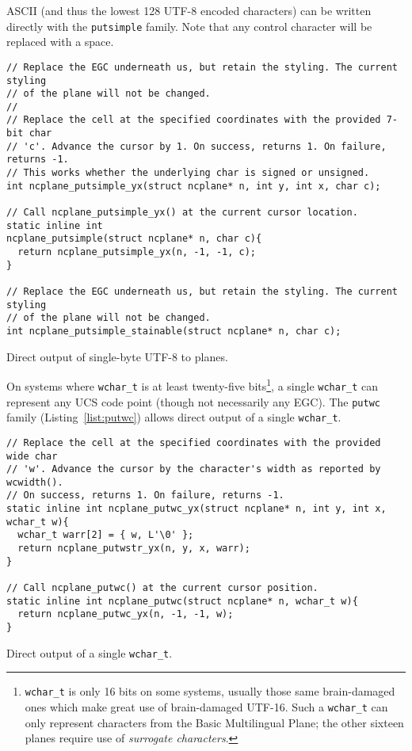 ASCII (and thus the lowest 128 UTF-8 encoded characters) can be written directly
with the \texttt{putsimple} family. Note that any control character will be replaced with
a space.

\begin{listing}[!htbp]
\begin{verbatim}
// Replace the EGC underneath us, but retain the styling. The current styling
// of the plane will not be changed.
//
// Replace the cell at the specified coordinates with the provided 7-bit char
// 'c'. Advance the cursor by 1. On success, returns 1. On failure, returns -1.
// This works whether the underlying char is signed or unsigned.
int ncplane_putsimple_yx(struct ncplane* n, int y, int x, char c);

// Call ncplane_putsimple_yx() at the current cursor location.
static inline int
ncplane_putsimple(struct ncplane* n, char c){
  return ncplane_putsimple_yx(n, -1, -1, c);
}

// Replace the EGC underneath us, but retain the styling. The current styling
// of the plane will not be changed.
int ncplane_putsimple_stainable(struct ncplane* n, char c);
\end{verbatim}
\caption{Direct output of single-byte UTF-8 to planes.}
\label{list:putc}
\end{listing}

On systems where \texttt{wchar\_t} is at least twenty-five bits\footnote{\texttt{wchar\_t}
  is only 16 bits on some systems, usually those same brain-damaged ones which
  make great use of brain-damaged UTF-16. Such a \texttt{wchar\_t} can only
represent characters from the Basic Multilingual Plane; the other sixteen planes
require use of \textit{surrogate characters}.}, a single \texttt{wchar\_t} can
represent any UCS code point (though not necessarily any EGC). The
\texttt{putwc} family (Listing~\ref{list:putwc}) allows direct output of a single \texttt{wchar\_t}.

\begin{listing}[!htbp]
\begin{verbatim}
// Replace the cell at the specified coordinates with the provided wide char
// 'w'. Advance the cursor by the character's width as reported by wcwidth().
// On success, returns 1. On failure, returns -1.
static inline int ncplane_putwc_yx(struct ncplane* n, int y, int x, wchar_t w){
  wchar_t warr[2] = { w, L'\0' };
  return ncplane_putwstr_yx(n, y, x, warr);
}

// Call ncplane_putwc() at the current cursor position.
static inline int ncplane_putwc(struct ncplane* n, wchar_t w){
  return ncplane_putwc_yx(n, -1, -1, w);
}
\end{verbatim}
\caption{Direct output of a single \texttt{wchar\_t}.}
\label{list:putwc}
\end{listing}

